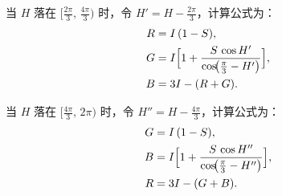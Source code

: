 \documentclass[UTF8]{article}
\begin{document}
当 \(H\) 落在 \(\bigl[\tfrac{2\pi}{3},\,\tfrac{4\pi}{3}\bigr)\) 时，令 \(H' = H - \tfrac{2\pi}{3}\)，计算公式为：
\begin{equation}\label{eq:hsi2rgb_case2}
\begin{aligned}
R &= I\,(1 - S),\\
G &= I\Bigl[1 + \frac{S\,\cos H'}{\cos\!\bigl(\tfrac{\pi}{3} - H'\bigr)}\Bigr],\\
B &= 3I - (R + G).
\end{aligned}
\end{equation}

当 \(H\) 落在 \(\bigl[\tfrac{4\pi}{3},\,2\pi\bigr)\) 时，令 \(H'' = H - \tfrac{4\pi}{3}\)，计算公式为：
\begin{equation}\label{eq:hsi2rgb_case3}
\begin{aligned}
G &= I\,(1 - S),\\
B &= I\Bigl[1 + \frac{S\,\cos H''}{\cos\!\bigl(\tfrac{\pi}{3} - H''\bigr)}\Bigr],\\
R &= 3I - (G + B).
\end{aligned}
\end{equation}
\end{document}
